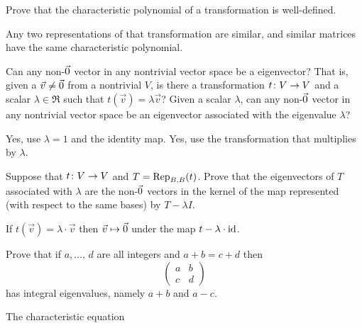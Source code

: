 \begin{exercises}
    Prove that 
    the characteristic polynomial of a transformation is well-defined.
    \begin{answer}
      Any two representations of that transformation are similar, and
      similar matrices have the same characteristic polynomial.  
    \end{answer}
  \recommended \item 
    \begin{exparts}
      \partsitem Can any non-\( \zero \) vector in any nontrivial vector space
        be a eigenvector?
        That is, given a \( \vec{v}\neq\zero \) from a nontrivial \( V \),
        is there a transformation \( \map{t}{V}{V} \) and a scalar
        \( \lambda\in\Re \) such that \( t(\vec{v})=\lambda\vec{v} \)?
      \partsitem Given a scalar \( \lambda \), can any non-\( \zero \)
        vector in any
        nontrivial vector space be an eigenvector associated with the
        eigenvalue \( \lambda \)?
    \end{exparts}
    \begin{answer}
      \begin{exparts}
        \partsitem Yes, use \( \lambda=1 \) and the identity map.
        \partsitem Yes, use the transformation that multiplies by 
          \( \lambda \).
      \end{exparts}  
     \end{answer}
  \recommended \item 
    Suppose that \( \map{t}{V}{V} \) and \( T=\rep{t}{B,B} \).
    Prove that the eigenvectors of \( T \) associated with \( \lambda \) are
    the non-\( \zero \) vectors in the kernel of the map represented
    (with respect to the same bases) by \( T-\lambda I \).
    \begin{answer}
      If $t(\vec{v})=\lambda\cdot\vec{v}$ then 
      $\vec{v}\mapsto\zero$ under the map $t-\lambda\cdot\identity$.
    \end{answer}
  \item 
    Prove that if $a,\ldots,\,d$ are all integers and \( a+b=c+d \) then
    \begin{equation*}
      \begin{pmatrix}
         a  &b  \\
         c  &d
      \end{pmatrix}
    \end{equation*}
    has integral eigenvalues, namely \( a+b \) and \( a-c \).
    \begin{answer}
      The characteristic equation 
      \begin{equation*}

\end{equation*}
\end{answer}
\end{exercises}
